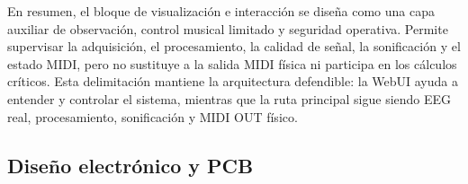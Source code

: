 \documentclass[../main.tex]{subfiles}
\begin{document}
En resumen, el bloque de visualización e interacción se diseña como una capa auxiliar de observación, control musical limitado y seguridad operativa. Permite supervisar la adquisición, el procesamiento, la calidad de señal, la sonificación y el estado MIDI, pero no sustituye a la salida MIDI física ni participa en los cálculos críticos. Esta delimitación mantiene la arquitectura defendible: la WebUI ayuda a entender y controlar el sistema, mientras que la ruta principal sigue siendo EEG real, procesamiento, sonificación y MIDI OUT físico.

\subsection{Diseño electrónico y PCB}


\end{document}
